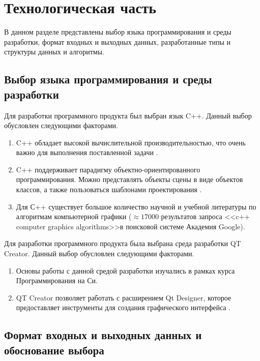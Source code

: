 \chapter{Технологическая часть}

В данном разделе представлены выбор языка программирования и среды разработки, формат входных и выходных данных, разработанные типы и структуры данных и алгоритмы.

\section{Выбор языка программирования и среды разработки}
Для разработки программного продукта был выбран язык C++.  Данный выбор обусловлен следующими факторами.

\begin{enumerate}[label=\arabic*)]
	\item C++ обладает высокой вычислительной производительностью, что очень важно для выполнения поставленной задачи \cite{cplusplusperfomance}.
	\item C++ поддерживает парадигму объектно-ориентированного программирования. Можно представлять объекты сцены в виде объектов классов, а также пользоваться шаблонами проектирования \cite{isocplusplus}.
	\item Для С++ существует большое количество научной и учебной литературы по алгоритмам компьютерной графики ($\approx17000$ результатов запроса <<c++ computer graphics algorithms>>в поисковой системе Академия Google).
\end{enumerate}

Для разработки программного продукта была выбрана среда разработки QT Creator. Данный выбор обусловлен следующими факторами.

\begin{enumerate}[label=\arabic*)]
	\item Основы работы с данной средой разработки изучались в рамках курса Программирования на Си.
	\item QT Creator позволяет работать с расширением Qt Designer, которое предоставляет инструменты для создания графического интерфейса \cite{qtdesigner}.
\end{enumerate}

\section{Формат входных и выходных данных и обоснование выбора}

